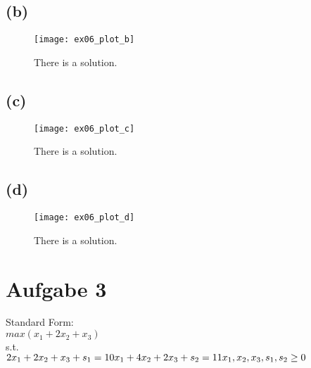 \documentclass[a4paper]{scrartcl}
\begin{document}
\subsection*{(b)}
\begin{figure}[H]
	\texttt{[image: ex06\_plot\_b]}
	\caption{There is a solution.}
\end{figure}



\subsection*{(c)}
\begin{figure}[H]
	\texttt{[image: ex06\_plot\_c]}
	\caption{There is a solution.}
\end{figure}



\subsection*{(d)}
\begin{figure}[H]
	\texttt{[image: ex06\_plot\_d]}
	\caption{There is a solution.}
\end{figure}








\section*{Aufgabe 3}

Standard Form:\\
$
max(x_1 + 2x_2 + x_3)
$\\
s.t.\\
$
2x_1 + 2x_2 + x_3 + s_1 = 10\\
x_1 + 4x_2 + 2x_3 + s_2 = 11\\
x_1, x_2, x_3, s_1, s_2 \geq 0
$
\end{document}
